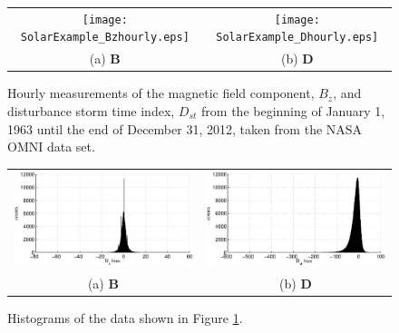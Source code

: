 \documentclass{article}[10pt]
\begin{document}
\begin{figure}[ht]
\begin{tabular}{cc}
\texttt{[image: SolarExample\_Bzhourly.eps]} & \texttt{[image: SolarExample\_Dhourly.eps]} \\
(a) $\mathbf{B}$ & (b) $\mathbf{D}$
\end{tabular}
\caption{Hourly measurements of the magnetic field component, $B_z$, and disturbance storm time index, $D_{st}$ from the beginning of January 1, 1963 until the end of December 31, 2012, taken from the NASA OMNI data set.}
\label{fig:BzDstHOURLYxyplot}
\end{figure}

\begin{figure}[ht]
\begin{tabular}{cc}
\includegraphics[scale=0.48]{SolarExample_Bzhourlyhist.eps} & \includegraphics[scale=0.48]{SolarExample_Dhourlyhist.eps} \\
(a) $\mathbf{B}$ & (b) $\mathbf{D}$
\end{tabular}
\caption{Histograms of the data shown in Figure \ref{fig:BzDstHOURLYxyplot}.}
\label{fig:BzDstHOURLYxyhist}
\end{figure}
\end{document}

